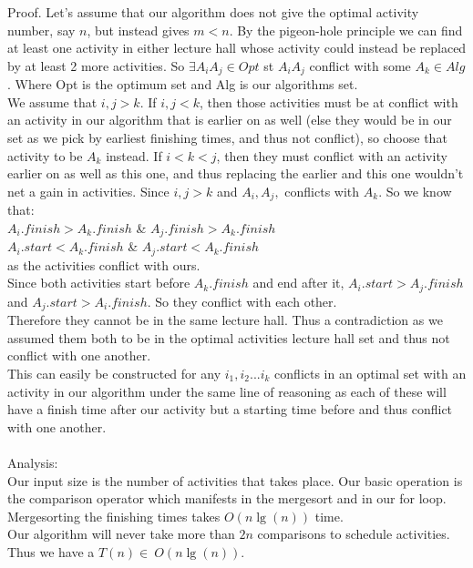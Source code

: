 \documentclass[12pt]{article}
\begin{document}
Proof.
Let's assume that our algorithm does not give the optimal activity number, say $n$, but instead gives $m < n$.
By the pigeon-hole principle we can find at least one activity in either lecture hall whose activity could
instead be replaced by at least 2 more activities.  So $ \exists A_i A_j \in Opt $ st $ A_i  A_j $ conflict with some $ A_k \in Alg $.  Where Opt is the optimum set and Alg 
is our algorithms set.\\
We assume that $i, j > k$.
If $i,j < k$, then those activities must be at conflict with an activity in our algorithm that is earlier on as well (else they would be in our set as we pick by earliest finishing times, and thus not conflict), so choose that activity to be $A_k$ instead.
If $i < k < j$, then they must conflict with an activity earlier on as well as this one, and thus replacing the earlier and this one wouldn't net a gain in activities.
Since $i, j > k$ and $A_i, A_j,$ conflicts with $A_k$.  So we know that:
\\
$A_i.finish > A_k.finish$ \& $A_j.finish > A_k.finish$\\
$A_i.start < A_k.finish$ \& $ A_j.start < A_k.finish$ \\
as the activities conflict with ours.\\
Since both activities start before $A_k.finish$ and end after it, $A_i.start > A_j.finish$ and $A_j.start > A_i.finish$. So they conflict with each other.\\

Therefore they cannot be in the same lecture hall.  Thus a contradiction as we assumed them both to be in the optimal activities lecture hall set and thus not conflict with one another.\\
This can easily be constructed for any $i_1,i_2...i_k$ conflicts in an optimal set with an activity in our algorithm under the same line of reasoning as each of these will have a finish time after our activity but a starting time before and thus conflict with one another.
\\
\\
Analysis:
\\
Our input size is the number of activities that takes place.  Our basic operation is the comparison operator which manifests in the mergesort and in our for loop.
Mergesorting the finishing times takes $ O(n \lg(n) )$ time.\\
Our algorithm will never take more than $2n$ comparisons to schedule activities.\\
Thus we have a $T(n) \in ~ O(n \lg(n) )$.
\end{document}

